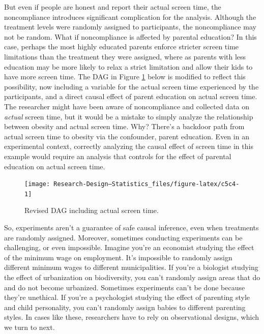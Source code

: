 \documentclass[
]{book}
\begin{document}
But even if people are honest and report their actual screen time, the noncompliance introduces significant complication for the analysis. Although the treatment levels were randomly assigned to participants, the noncompliance may not be random. What if noncompliance is affected by parental education? In this case, perhaps the most highly educated parents enforce stricter screen time limitations than the treatment they were assigned, where as parents with less education may be more likely to relax a strict limitation and allow their kids to have more screen time. The DAG in Figure \ref{fig:c5c4} below is modified to reflect this possibility, now including a variable for the actual screen time experienced by the participants, and a direct causal effect of parent education on actual screen time. The researcher might have been aware of noncompliance and collected data on \emph{actual} screen time, but it would be a mistake to simply analyze the relationship between obesity and actual screen time. Why? There's a backdoor path from actual screen time to obesity via the confounder, parent education. Even in an experimental context, correctly analyzing the causal effect of screen time in this example would require an analysis that controls for the effect of parental education on actual screen time.

\begin{figure}

{\centering \texttt{[image: Research-Design---Statistics\_files/figure-latex/c5c4-1]} 

}

\caption{Revised DAG including actual screen time.}\label{fig:c5c4}
\end{figure}

So, experiments aren't a guarantee of safe causal inference, even when treatments are randomly assigned. Moreover, sometimes conducting experiments can be challenging, or even impossible. Imagine you're an economist studying the effect of the minimum wage on employment. It's impossible to randomly assign different minimum wages to different municipalities. If you're a biologist studying the effect of urbanization on biodiversity, you can't randomly assign areas that do and do not become urbanized. Sometimes experiments can't be done because they're unethical. If you're a psychologist studying the effect of parenting style and child personality, you can't randomly assign babies to different parenting styles. In cases like these, researchers have to rely on observational designs, which we turn to next.
\end{document}
